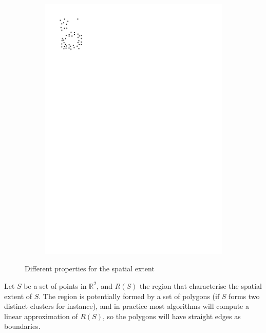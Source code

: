 \begin{figure}
\begin{subfigure}[b]{0.2\linewidth}
    \includegraphics[page=3,width=\textwidth]{figs/properties.pdf}
    \caption{}
  \end{subfigure}
\caption{Different properties for the spatial extent}%
\end{figure}

Let $S$ be a set of points in $\mathbb{R}^2$, and $R(S)$ the region that characterise the spatial extent of $S$.
The region is potentially formed by a set of polygons (if $S$ forms two distinct clusters for instance), and in practice most algorithms will compute a linear approximation of $R(S)$, so the polygons will have straight edges as boundaries.

